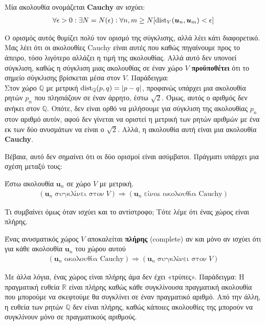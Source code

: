 \documentclass[main.tex]{subfiles}
\begin{document}
	\begin{definition}
		Μία ακολουθία ονομάζεται \textbf{Cauchy} αν ισχύει:
		\begin{align*}
			\forall\epsilon>0:\exists N = N(\epsilon):\forall n,m\geq N [\operatorname{dist}_V(\boldsymbol{u}_n, \boldsymbol{u}_m) < \epsilon]
		\end{align*}
	\end{definition}
	Ο ορισμός αυτός θυμίζει πολύ τον ορισμό της σύγκλισης, αλλά λέει κάτι διαφορετικό. Μας λέει ότι οι ακολουθίες Cauchy είναι αυτές που καθώς πηγαίνουμε προς το άπειρο, τόσο λιγότερο αλλάζει η τιμή της ακολουθίας. Αλλά αυτό δεν υπονοεί σύγκλιση, καθώς η σύγκλιση μιας ακολουθίας σε έναν χώρο $V$ \textbf{προϋποθέτει} ότι το σημείο σύγκλισης βρίσκεται μέσα στον $V$. Παράδειγμα:\\
	Στον χώρο $\mathbb{Q}$ με μετρική ${\operatorname{dist}_\mathbb{Q}(p, q) = |p - q|}$, προφανώς υπάρχει μια ακολουθία ρητών $p_n$ που πλησιάζουν σε έναν άρρητο, έστω $\sqrt{2}$. Όμως, αυτός ο αριθμός δεν ανήκει στον $\mathbb{Q}$. Οπότε, δεν είναι ορθό να μιλήσουμε για σύγκλιση της ακολουθίας $p_n$ στον αριθμό αυτόν, αφού δεν γίνεται να οριστεί η μετρική των ρητών αριθμών με ένα εκ των δύο ανυσμάτων να είναι ο $\sqrt{2}$. Αλλά, η ακολουθία αυτή είναι μια ακολουθία \textbf{Cauchy}.
	
	Βέβαια, αυτό δεν σημαίνει ότι οι δύο ορισμοί είναι ασύμβατοι. Πράγματι υπάρχει μια σχέση μεταξύ τους:
	\begin{corollary}
		Έστω ακολουθία $\boldsymbol{u}_n$ σε χώρο $V$ με μετρική.
		\begin{align*}
			(\boldsymbol{u}_n \; \text{συγκλίνει στον}\; V) \Rightarrow (\boldsymbol{u}_n \; \text{είναι ακολουθία Cauchy})
		\end{align*}
	\end{corollary}
	Τι συμβαίνει όμως όταν ισχύει και το αντίστροφο; Τότε λέμε ότι ένας χώρος είναι πλήρης.
	\begin{definition}
		Ένας ανυσματικός χώρος $V$ αποκαλείται \textbf{πλήρης} (complete) αν και μόνο αν ισχύει ότι για κάθε ακολουθία $\boldsymbol{u}_n$ του χώρου αυτού
		\begin{align*}
			(\boldsymbol{u}_n\; \text{ακολουθία Cauchy}) \Rightarrow (\boldsymbol{u}_n\; \text{συγκλίνει στον}\; V)
 		\end{align*}
	\end{definition}
	Με άλλα λόγια, ένας χώρος είναι πλήρης άμα δεν έχει «τρύπες».
	Παράδειγμα: Η πραγματική ευθεία $\mathbb{R}$ είναι πλήρης καθώς κάθε συγκλίνουσα πραγματική ακολουθία που μπορούμε να σκεφτούμε θα συγκλίνει σε έναν πραγματικό αριθμό. Από την άλλη, η ευθεία των ρητών $\mathbb{Q}$ δεν είναι πλήρης, καθώς κάποιες ακολουθίες της μπορούν να συγκλίνουν μόνο σε πραγματικούς αριθμούς.
\end{document}
